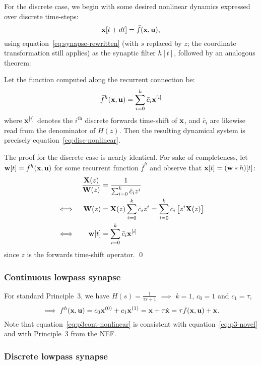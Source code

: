 For the discrete case, we begin with some desired nonlinear dynamics expressed over discrete time-steps:
\begin{equation} \label{eq:disc-nonlinear}
\mathbf{x}[t+dt] = \bar{f}(\mathbf{x}, \mathbf{u}) \text{,}
\end{equation}
using equation~\ref{eq:synapse-rewritten} (with $s$ replaced by $z$; the coordinate transformation still applies) as the synaptic filter $h[t]$, followed by an analogous theorem:
\begin{theorem} \label{thm:p3disc-nonlinear}
Let the function computed along the recurrent connection be:
\begin{align}
\bar{f}^h(\mathbf{x}, \mathbf{u}) = \sum_{i=0}^k \bar{c}_i \mathbf{x}^{[i]}
\end{align}
where $\mathbf{x}^{[i]}$ denotes the $i^\text{th}$ discrete forwards time-shift of $\mathbf{x}$, and $\bar{c}_i$ are likewise read from the denominator of $H(z)$.
Then the resulting dynamical system is precisely equation~\ref{eq:disc-nonlinear}.
\end{theorem}
The proof for the discrete case is nearly identical.
For sake of completeness, let $\mathbf{w}[t] = \bar{f}^h(\mathbf{x}, \mathbf{u})$ for some recurrent function $\bar{f}^h$ and observe that $\mathbf{x}[t] = (\mathbf{w} \ast h)[t]$:
\begin{align*}
&& \frac{\mathbf{X}(z)}{\mathbf{W}(z)} &= \frac{1}{\sum_{i=0}^k \bar{c}_i z^i} \\
\iff && \mathbf{W}(z) &= \mathbf{X}(z) \sum_{i=0}^k \bar{c}_i z^i = \sum_{i=0}^k \bar{c}_i \left[ z^i \mathbf{X}(z) \right] \\
\iff && \mathbf{w}[t] &= \sum_{i=0}^k \bar{c}_i \mathbf{x}^{[i]}
\end{align*}
since $z$ is the forwards time-shift operator. \qed

\subsubsection{Continuous lowpass synapse}

For standard Principle~3, we have $H(s) = \frac{1}{\tau s + 1}$ $\implies$ $k = 1$, $c_0 = 1$ and $c_1 = \tau$, 
\begin{equation} \label{eq:p3cont-nonlinear}
\implies f^h(\mathbf{x}, \mathbf{u}) = c_0 \mathbf{x}^{(0)} + c_1 \mathbf{x}^{(1)} = \mathbf{x} + \tau \dot{\mathbf{x}} = \tau f(\mathbf{x}, \mathbf{u}) + \mathbf{x} \text{.}
\end{equation}
Note that equation~\ref{eq:p3cont-nonlinear} is consistent with equation~\ref{eq:p3-novel} and with Principle~3 from the NEF.

\subsubsection{Discrete lowpass synapse}

